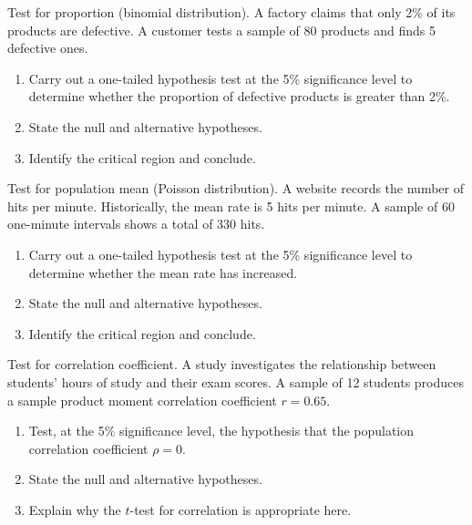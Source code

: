 \documentclass[11pt]{article}
\def\textbf#1{#1}%
\newcounter{question}
\begin{document}
\begin{question}
\textbf{Test for proportion (binomial distribution).}
A factory claims that only 2\% of its products are defective. A customer tests a sample of 80 products and finds 5 defective ones.
\begin{enumerate}
    \item Carry out a one-tailed hypothesis test at the 5\% significance level to determine whether the proportion of defective products is greater than 2\%.
    \item State the null and alternative hypotheses.
    \item Identify the critical region and conclude.
\end{enumerate}
\end{question}

\begin{question}
\textbf{Test for population mean (Poisson distribution).}
A website records the number of hits per minute. Historically, the mean rate is 5 hits per minute. A sample of 60 one-minute intervals shows a total of 330 hits.
\begin{enumerate}
    \item Carry out a one-tailed hypothesis test at the 5\% significance level to determine whether the mean rate has increased.
    \item State the null and alternative hypotheses.
    \item Identify the critical region and conclude.
\end{enumerate}
\end{question}

\begin{question}
\textbf{Test for correlation coefficient.}
A study investigates the relationship between students' hours of study and their exam scores. A sample of 12 students produces a sample product moment correlation coefficient $r=0.65$. 
\begin{enumerate}
    \item Test, at the 5\% significance level, the hypothesis that the population correlation coefficient $\rho=0$.
    \item State the null and alternative hypotheses.
    \item Explain why the $t$-test for correlation is appropriate here.
\end{enumerate}
\end{question}
\end{document}
